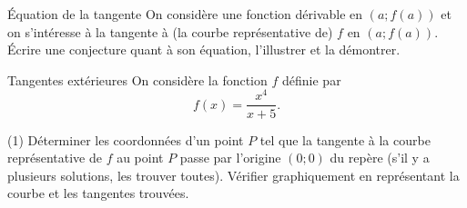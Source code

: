 \documentclass[a4paper,12pt]{article}
\begin{document}
\begin{activite}{Équation de la tangente}
\tcblower
On considère une fonction dérivable en \((a;f(a))\) et on s’intéresse à la tangente à (la courbe représentative de) \(f\) en \((a;f(a))\). Écrire une conjecture quant à son équation, l’illustrer et la démontrer.
\end{activite}

\begin{activite}{Tangentes extérieures}
\tcblower
On considère la fonction \(f\) définie par
\[
  f(x)=\dfrac{x^4}{x+5}.
\]
\begin{tasks}(1)
  \task Déterminer les coordonnées d’un point \(P\) tel que la tangente à la courbe représentative de \(f\) au point \(P\) passe par l’origine \((0;0)\) du repère (s’il y a plusieurs solutions, les trouver toutes).
  \task Vérifier graphiquement en représentant la courbe et les tangentes trouvées.
\end{tasks}
\end{activite}
\end{document}
